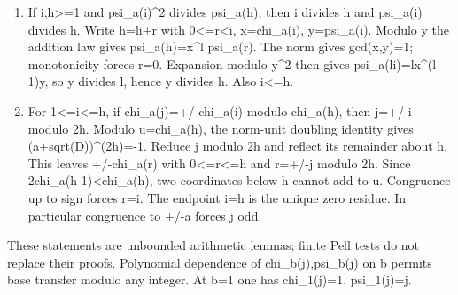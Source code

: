 \begin{enumerate}

\item If i,h\textgreater{}\allowbreak{}=\allowbreak{}1 and psi\_\allowbreak{}a(i)\textasciicircum{}\allowbreak{}2 divides psi\_\allowbreak{}a(h), then i divides h and psi\_\allowbreak{}a(i) divides h. Write h=\allowbreak{}li+\allowbreak{}r with 0\textless{}\allowbreak{}=\allowbreak{}r\textless{}\allowbreak{}i, x=\allowbreak{}chi\_\allowbreak{}a(i), y=\allowbreak{}psi\_\allowbreak{}a(i). Modulo y the addition law gives psi\_\allowbreak{}a(h)=\allowbreak{}x\textasciicircum{}\allowbreak{}l psi\_\allowbreak{}a(r). The norm gives gcd(x,y)=\allowbreak{}1; monotonicity forces r=\allowbreak{}0. Expansion modulo y\textasciicircum{}\allowbreak{}2 then gives psi\_\allowbreak{}a(li)=\allowbreak{}l\textasteriskcentered{}\allowbreak{}x\textasciicircum{}\allowbreak{}(l-1)\textasteriskcentered{}\allowbreak{}y, so y divides l, hence y divides h. Also i\textless{}\allowbreak{}=\allowbreak{}h.

\item For 1\textless{}\allowbreak{}=\allowbreak{}i\textless{}\allowbreak{}=\allowbreak{}h, if chi\_\allowbreak{}a(j)=\allowbreak{}+\allowbreak{}/\allowbreak{}-chi\_\allowbreak{}a(i) modulo chi\_\allowbreak{}a(h), then j=\allowbreak{}+\allowbreak{}/\allowbreak{}-i modulo 2h. Modulo u=\allowbreak{}chi\_\allowbreak{}a(h), the norm-unit doubling identity gives (a+\allowbreak{}sqrt(D))\textasciicircum{}\allowbreak{}(2h)=\allowbreak{}-1. Reduce j modulo 2h and reflect its remainder about h. This leaves +\allowbreak{}/\allowbreak{}-chi\_\allowbreak{}a(r) with 0\textless{}\allowbreak{}=\allowbreak{}r\textless{}\allowbreak{}=\allowbreak{}h and r=\allowbreak{}+\allowbreak{}/\allowbreak{}-j modulo 2h. Since 2\textasteriskcentered{}\allowbreak{}chi\_\allowbreak{}a(h-1)\textless{}\allowbreak{}chi\_\allowbreak{}a(h), two coordinates below h cannot add to u. Congruence up to sign forces r=\allowbreak{}i. The endpoint i=\allowbreak{}h is the unique zero residue. In particular congruence to +\allowbreak{}/\allowbreak{}-a forces j odd.

\end{enumerate}



These statements are unbounded arithmetic lemmas; finite Pell tests do not replace their proofs. Polynomial dependence of chi\_\allowbreak{}b(j),psi\_\allowbreak{}b(j) on b permits base transfer modulo any integer. At b=\allowbreak{}1 one has chi\_\allowbreak{}1(j)=\allowbreak{}1, psi\_\allowbreak{}1(j)=\allowbreak{}j.



